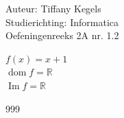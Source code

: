 \documentclass[a4paper]{article}
\begin{document}
  
\noindent \large Auteur: Tiffany Kegels \\
\noindent \large Studierichting: Informatica\\
\noindent \large Oefeningenreeks 2A nr. 1.2\\

\medskip

\normalsize

$f(x) = x + 1$\\

$\operatorname{dom} f = \mathbb{R}$\\

$\operatorname{Im} f = \mathbb{R}$



\begin{thebibliography}{999}

\end{thebibliography}
\end{document}
